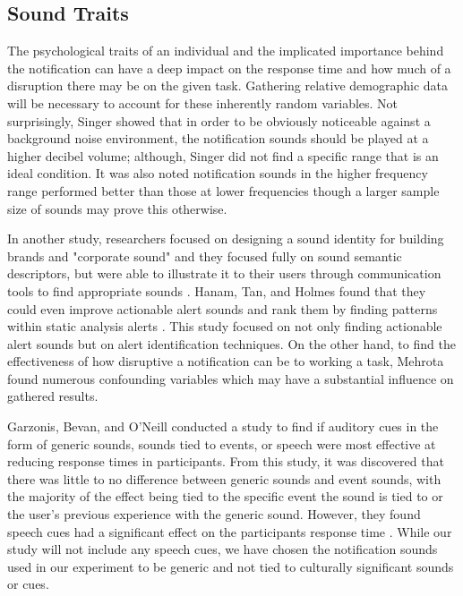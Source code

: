 \documentclass[manuscript,screen,review]{acmart}
\begin{document}
\subsection{Sound Traits}
The psychological traits of an individual and the implicated importance behind the notification can have a deep impact on the response time and how much of a disruption there may be on the given task. Gathering relative demographic data will be necessary to account for these inherently random variables. Not surprisingly, Singer \cite{Singer} showed that in order to be obviously noticeable against a background noise environment, the notification sounds should be played at a higher decibel volume; although, Singer did not find a specific range that is an ideal condition. It was also noted notification sounds in the higher frequency range performed better than those at lower frequencies though a larger sample size of sounds may prove this otherwise.

In another study, researchers focused on designing a sound identity for building brands and "corporate sound" and they focused fully on sound semantic descriptors, but were able to illustrate it to their users through communication tools to find appropriate sounds \cite{10.1145/2636879.2636896}.  Hanam, Tan, and Holmes found that they could even improve actionable alert sounds and rank them by finding patterns within static analysis alerts \cite{10.1145/2597073.2597100}. This study focused on not only finding actionable alert sounds but on alert identification techniques. On the other hand, to find the effectiveness of how disruptive a notification can be to working a task, Mehrota \cite{10.1145/2858036.2858566} found numerous confounding variables which may have a substantial influence on gathered results.

Garzonis, Bevan, and O'Neill conducted a study to find if auditory cues in the form of generic sounds, sounds tied to events, or speech were most effective at reducing response times in participants. From this study, it was discovered that there was little to no difference between generic sounds and event sounds, with the majority of the effect being tied to the specific event the sound is tied to or the user's previous experience with the generic sound. However, they found speech cues had a significant effect on the participants response time \cite{10.1145/1517744.1517793}. While our study will not include any speech cues, we have chosen the notification sounds used in our experiment to be generic and not tied to culturally significant sounds or cues.
\end{document}
